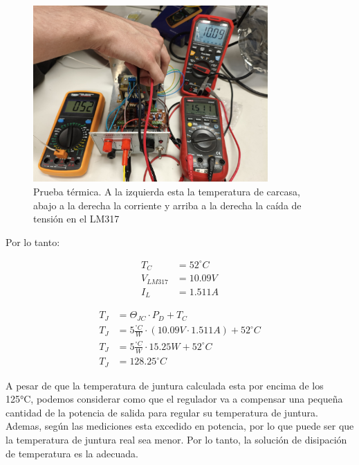 \documentclass[chaptersright]{informeutn}
\begin{document}
        \begin{figure}[!h]
          \centering
          \includegraphics[width=0.8\textwidth]{pictures/reg_prueb-term.jpeg}
          \caption{Prueba térmica. A la izquierda esta la temperatura de carcasa, abajo a la derecha la corriente y
                   arriba a la derecha la caída de tensión en el LM317}
        \end{figure}

        Por lo tanto:
        \begin{figure}[!h]
          \centering
          \begin{minipage}{0.4\textwidth}
            \begin{align*}
              T_C &= 52^\circ C\\[6pt]
              V_{LM317} &= 10.09V\\[6pt]
              I_L &= 1.511A
            \end{align*}
          \end{minipage}
          \begin{minipage}{0.4\textwidth}
            \begin{align*}
              T_J &= \Theta_{JC} \cdot P_D + T_C\\[6pt]
              T_J &= 5\frac{^\circ C}{W} \cdot (10.09V \cdot 1.511A) + 52^\circ C\\[6pt]
              T_J &= 5\frac{^\circ C}{W} \cdot 15.25W + 52^\circ C\\[6pt]
              T_J &= 128.25^\circ C
            \end{align*}
          \end{minipage}
        \end{figure}

        A pesar de que la temperatura de juntura calculada esta por encima de los 125°C, podemos considerar como que
        el regulador va a compensar una pequeña cantidad de la potencia de salida para regular su temperatura de
        juntura. Ademas, según las mediciones esta excedido en potencia, por lo que puede ser que la temperatura de
        juntura real sea menor. Por lo tanto, la solución de disipación de temperatura es la adecuada.
\end{document}
